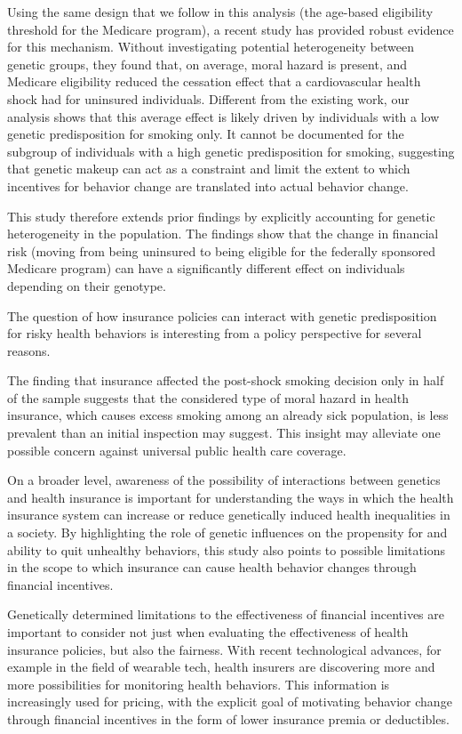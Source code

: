 \documentclass[12pt]{article}
\begin{document}
Using the same design that we follow in this analysis (the age-based eligibility threshold for the Medicare program), a recent study has provided robust evidence for this mechanism.\cite{Marti2017} Without investigating potential heterogeneity between genetic groups, they found that, on average, moral hazard is present, and Medicare eligibility reduced the cessation effect that a cardiovascular health shock had for uninsured individuals. Different from the existing work, our analysis shows that this average effect is likely driven by individuals with a low genetic predisposition for smoking only. It cannot be documented for the subgroup of individuals with a high genetic predisposition for smoking, suggesting that genetic makeup can act as a constraint and limit the extent to which incentives for behavior change are translated into actual behavior change.


This study therefore extends prior findings by explicitly accounting for genetic heterogeneity in the population. The findings show that the change in financial risk (moving from being uninsured to being eligible for the federally sponsored Medicare program) can have a significantly different effect on individuals depending on their genotype.

The question of how insurance policies can interact with genetic predisposition for risky health behaviors is interesting from a policy perspective for several reasons.

The finding that insurance affected the post-shock smoking decision only in half of the sample suggests that the considered type of moral hazard in health insurance, which causes excess smoking among an already sick population, is less prevalent than an initial inspection may suggest. This insight may alleviate one possible concern against universal public health care coverage.\cite{Mendoza2016,Einav2018}

On a broader level, awareness of the possibility of interactions between genetics and health insurance is important for understanding the ways in which the health insurance system can increase or reduce genetically induced health inequalities in a society. By highlighting the role of genetic influences on the propensity for and ability to quit unhealthy behaviors, this study also points to possible limitations in the scope to which insurance can cause health behavior changes through financial incentives.

Genetically determined limitations to the effectiveness of financial incentives are important to consider not just when evaluating the effectiveness of health insurance policies, but also the fairness. With recent technological advances, for example in the field of wearable tech, health insurers are discovering more and more possibilities for monitoring health behaviors. This information is increasingly used for pricing, with the explicit goal of motivating behavior change through financial incentives in the form of lower insurance premia or deductibles.\cite{Forbes2014,SwissRe2017}
\end{document}
